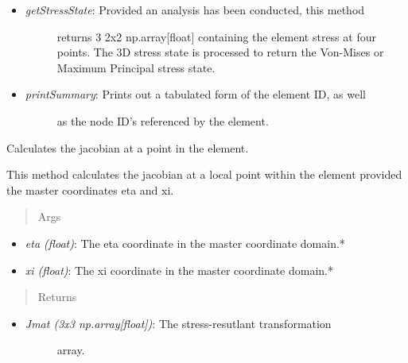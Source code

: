 \documentclass[letterpaper,10pt,english]{sphinxmanual}
\begin{document}
\begin{fulllineitems}
\begin{itemize}
\item {} \begin{description}
\item[{\emph{getStressState}: Provided an analysis has been conducted, this method}] \leavevmode
returns 3 2x2 np.array{[}float{]} containing the element stress at four
points. The 3D stress state is processed to return the Von-Mises
or Maximum Principal stress state.

\end{description}

\item {} \begin{description}
\item[{\emph{printSummary}: Prints out a tabulated form of the element ID, as well}] \leavevmode
as the node ID's referenced by the element.

\end{description}

\end{itemize}

\begin{fulllineitems}
\label{structures:AeroComBAT.Structures.CQUAD4.J}
Calculates the jacobian at a point in the element.

This method calculates the jacobian at a local point within the element
provided the master coordinates eta and xi.
\begin{quote}\begin{description}
\item[{Args}] \leavevmode
\end{description}\end{quote}
\begin{itemize}
\item {} 
\emph{eta (float)}: The eta coordinate in the master coordinate domain.*

\item {} 
\emph{xi (float)}: The xi coordinate in the master coordinate domain.*

\end{itemize}
\begin{quote}\begin{description}
\item[{Returns}] \leavevmode
\end{description}\end{quote}
\begin{itemize}
\item {} \begin{description}
\item[{\emph{Jmat (3x3 np.array{[}float{]})}: The stress-resutlant transformation}] \leavevmode
array.


\end{description}
\end{itemize}
\end{fulllineitems}
\end{fulllineitems}
\end{document}
